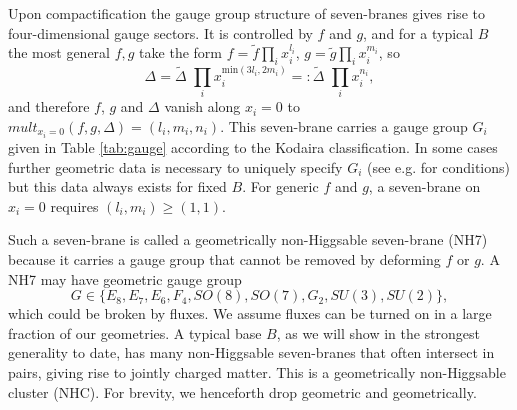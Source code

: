 \documentclass[aps,prl,twocolumn, superscriptaddress,groupedaddress,nofootinbib]{revtex4-1}
\begin{document}
Upon compactification the gauge group structure of seven-branes gives rise
to four-dimensional gauge sectors. It is controlled by $f$ and
$g$, and for a typical $B$ the most general $f, g$ take the
form $f=\tilde f \prod_i x_i^{l_i}$, $g=\tilde g \prod_i x_i^{m_i}$,
so
\begin{equation}
\Delta = \tilde \Delta\,\,  \prod_i x_i^{\text{min}(3l_i,2m_i)}=: \tilde \Delta\,\,  \prod_i x_i^{n_i},
\end{equation}
and therefore $f$, $g$ and $\Delta$ vanish along $x_i=0$ to 
$mult_{x_i=0}(f,g,\Delta)=(l_i,m_i,n_i).$ This seven-brane carries
a gauge group $G_i$ given in Table \ref{tab:gauge}
according to the Kodaira classification. In some cases
further geometric data is necessary to uniquely 
specify $G_i$ (see e.g. 
\cite{Halverson:2015jua} for conditions) but this data
always exists for fixed $B$. 
For generic $f$ and $g$, a seven-brane on $x_i=0$
requires $(l_i,m_i)\geq(1,1)$.

Such a seven-brane is called a geometrically non-Higgsable
seven-brane (NH7) because it carries a gauge group that cannot
be removed by deforming $f$ or $g$. A NH7 may have geometric gauge group
\begin{equation}
G\in \{E_8,E_7,E_6,F_4,SO(8),SO(7),G_2,SU(3),SU(2)\}, \nonumber
\end{equation} 
which could be broken by fluxes. We assume fluxes can be turned on in a large fraction
of our geometries.
A typical base $B$, as
we will show in the strongest generality to date, has many non-Higgsable seven-branes
that often intersect in pairs, giving rise to jointly charged
matter. This is a geometrically
non-Higgsable cluster (NHC). For brevity, we henceforth drop 
geometric and geometrically.
\end{document}
